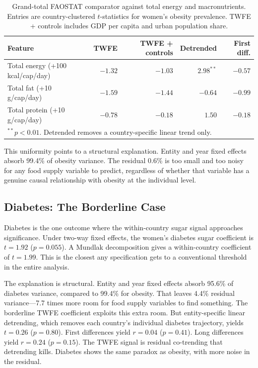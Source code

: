 \documentclass[letterpaper,11pt,leqno]{article}
\begin{document}
\begin{table}[htbp]
\centering
\caption{Grand-total FAOSTAT comparator against total energy and macronutrients. Entries are country-clustered $t$-statistics for women's obesity prevalence. TWFE + controls includes GDP per capita and urban population share.}
\label{tab:energy_comparator}
\small
\begin{tabular}{lrrrr}
\toprule
Feature & TWFE & TWFE + controls & Detrended & First diff. \\
\midrule
Total energy (+100 kcal/cap/day) & $-1.32$ & $-1.03$ & $2.98^{**}$ & $-0.57$ \\
Total fat (+10 g/cap/day) & $-1.59$ & $-1.44$ & $-0.64$ & $-0.99$ \\
Total protein (+10 g/cap/day) & $-0.78$ & $-0.18$ & $1.50$ & $-0.18$ \\
\bottomrule
\multicolumn{5}{l}{\footnotesize $^{**}p < 0.01$. Detrended removes a country-specific linear trend only.}
\end{tabular}
\end{table}

This uniformity points to a structural explanation. Entity and year fixed effects absorb 99.4\% of obesity variance. The residual 0.6\% is too small and too noisy for any food supply variable to predict, regardless of whether that variable has a genuine causal relationship with obesity at the individual level.

\subsection{Diabetes: The Borderline Case}

Diabetes is the one outcome where the within-country sugar signal approaches significance. Under two-way fixed effects, the women's diabetes sugar coefficient is $t = 1.92$ ($p = 0.055$). A Mundlak decomposition gives a within-country coefficient of $t = 1.99$. This is the closest any specification gets to a conventional threshold in the entire analysis.

The explanation is structural. Entity and year fixed effects absorb 95.6\% of diabetes variance, compared to 99.4\% for obesity. That leaves 4.4\% residual variance---7.7 times more room for food supply variables to find something. The borderline TWFE coefficient exploits this extra room. But entity-specific linear detrending, which removes each country's individual diabetes trajectory, yields $t = 0.26$ ($p = 0.80$). First differences yield $r = 0.04$ ($p = 0.41$). Long differences yield $r = 0.24$ ($p = 0.15$). The TWFE signal is residual co-trending that detrending kills. Diabetes shows the same paradox as obesity, with more noise in the residual.
\end{document}
